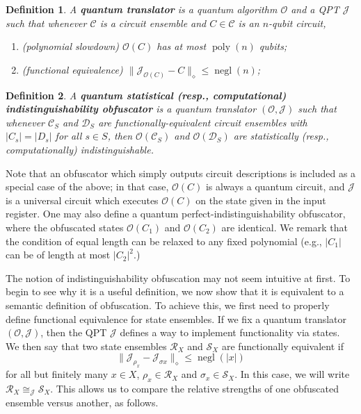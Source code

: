 \documentclass[11pt]{article}
\numberwithin{equation}{section}
\newtheorem{definition}{Definition}
\newcommand{\opn}{\operatorname}
\newcommand{\algo}{\mathcal}
\newcommand{\negl}{\opn{negl}}
\newcommand{\poly}{\opn{poly}}
\begin{document}
{\begin{definition}\label{def:translator}
A \textbf{quantum translator} is a quantum algorithm $\mathcal O$ and a QPT $\mathcal J$ such that whenever $\mathcal C$ is a circuit ensemble and $C \in \mathcal C$ is an $n$-qubit circuit, 
\begin{enumerate}
\item (polynomial slowdown) $\mathcal O(C)$ has at most $\poly(n)$ qubits;
\item (functional equivalence) $\bigl\| \algo J_{\mathcal O(C)} - C \bigr\|_\diamond \leq \negl(n)$;
\end{enumerate}
\end{definition}

\begin{definition}\label{def:indistinguishability}
A \textbf{quantum statistical (resp., computational) indistinguishability obfuscator} is a quantum translator $(\mathcal O, \mathcal J)$ such that whenever $\mathcal C_S$ and $\mathcal D_S$ are functionally-equivalent circuit ensembles with $|C_s| = |D_s|$ for all $s \in S$, then $\mathcal O(\mathcal C_S)$ and $\mathcal O(\mathcal D_S)$ are statistically (resp., computationally) indistinguishable.
\end{definition}

Note that an obfuscator which simply outputs circuit descriptions is included as a special case of the above; in that case, $\mathcal O(C)$ is always a quantum circuit, and $\mathcal J$ is a universal circuit which executes $\mathcal O(C)$ on the state given in the input register. One may also define a quantum perfect-indistinguishability obfuscator, where the obfuscated states $\mathcal O(C_1)$ and $\mathcal O(C_2)$ are identical. We remark that the condition of equal length can be relaxed to any fixed polynomial (e.g., $|C_1|$ can be of length at most $|C_2|^2$.)

The notion of indistinguishability obfuscation may not seem intuitive at first. To begin to see why it is a useful definition, we now show that it is equivalent to a semantic definition of obfuscation. To achieve this, we first need to properly define functional equivalence for state ensembles. If we fix a quantum translator $(\mathcal O, \mathcal J)$, then the QPT $\mathcal J$ defines a way to implement functionality via states. We then say that two state ensembles $\mathcal R_X$ and $\mathcal S_X$ are functionally equivalent if
$$
\bigl\| \algo J_{\rho_x} - \algo J_{\sigma x} \bigr\|_\diamond \leq \negl(|x|)
$$
for all but finitely many $x \in X$, $\rho_x \in \mathcal R_X$ and $\sigma_x \in \mathcal S_X$. In this case, we will write $\mathcal R_X \cong_{\algo J} \mathcal S_X$. This allows us to compare the relative strengths of one obfuscated ensemble versus another, as follows.

}
\end{document}
